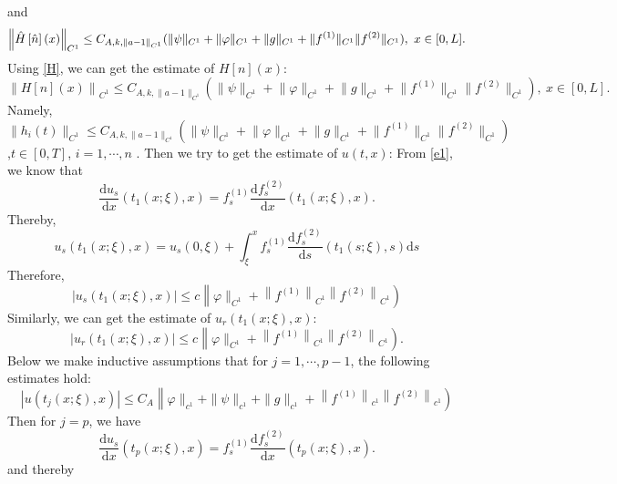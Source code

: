 \documentclass[a4paper,reqno,11pt]{amsart}
\numberwithin{equation}{section} %
\begin{document}
and
\begin{equation}\label{estimate of hat{H}}
	\left\| \hat{H}\left[ \hat{n} \right] \left( x \right) \right\|_{C^1} \leq C_{A,k,\lVert a-1 \rVert _{C^1}}(\lVert \psi \rVert _{C^1}+\lVert \varphi  \rVert _{C^1}+  \lVert g \rVert _{C^1}+\lVert f^{(1)} \rVert _{C^1}\lVert f^{(2)} \rVert _{C^1}) ,\ x\in [0,L].
\end{equation}
Using \eqref{H}, we can get the estimate of $H\left[ n \right] \left( x \right)$:
\begin{equation}\label{estimate of H[n]}
	\left\| H\left[ n \right] \left( x \right) \right\|_{C^1} \leq C_{A,k,\lVert a-1 \rVert _{C^1}}(\lVert \psi \rVert _{C^1}+\lVert \varphi  \rVert _{C^1}+  \lVert g \rVert _{C^1}+\lVert f^{(1)} \rVert _{C^1}\lVert f^{(2)} \rVert _{C^1}) ,\ x\in [0,L].
\end{equation}
Namely, $\lVert h_i(t) \rVert _{C^1}  \leq C_{A,k,\lVert a-1 \rVert _{C^1}}(\lVert \psi \rVert _{C^1}+\lVert \varphi  \rVert _{C^1}+  \lVert g \rVert _{C^1}+\lVert f^{(1)} \rVert _{C^1}\lVert f^{(2)} \rVert _{C^1}) $,$ t \in [0,T]$,  $i=1,\cdots,n$ .
Then we try to get the estimate of $u(t,x)$:
From \eqref{e1}, we know that
$$
\frac{\mathrm{d}u_s}{\mathrm{d}x}\left( t_1(x;\xi ),x \right) =f_{s}^{(1)}\frac{\mathrm{d}f_{s}^{(2)}}{\mathrm{d}x}\left( t_1(x;\xi ),x \right) .
$$
Thereby,
$$
u_s\left( t_1\left( x;\xi \right) ,x \right) =u_s(0,\xi )+\int_{\xi}^x{f_{s}^{(1)}\frac{\mathrm{d}f_{s}^{(2)}}{\mathrm{d}s}\left( t_1\left( s;\xi \right) ,s \right) \mathrm{d}s}
$$
Therefore,
$$
\left| u_s\left( t_1(x;\xi ),x \right) \right|\leqslant c\left\| \varphi \parallel _{C^1}+\left\| f^{(1)} \right\| _{C^1}\left\| f^{(2)} \right\| _{C^1} \right) 
$$
Similarly, we can get the estimate of $u_r\left( t_1(x;\xi ),x \right) $:
$$
\left| u_r\left( t_1(x;\xi ),x \right) \right|\leqslant c\left\| \varphi \parallel _{C^1}+\left\| f^{(1)} \right\| _{C^1}\left\| f^{(2)} \right\| _{C^1} \right) .
$$
Below we make inductive assumptions that for $j=1,\cdots,p-1$, the following estimates hold:
\begin{equation}\label{inductive assumption}
\left| u\left( t_j(x;\xi ),x \right) \right|\leqslant C_A\left\| \varphi \parallel _{c^1}+\parallel \psi \parallel _{c^1}+\parallel g\parallel _{c^1}+\left\| f^{(1)} \right\| _{c^1}\left\| f^{(2)} \right\| _{c^1} \right) 
\end{equation}
Then for $j=p$, we have
$$
\frac{\mathrm{d}u_s}{\mathrm{d}x}\left( t_p(x;\xi ),x \right) =f_{s}^{(1)}\frac{\mathrm{d}f_{s}^{(2)}}{\mathrm{d}x}\left( t_p(x;\xi ),x \right) .
$$
and thereby
\end{document}
